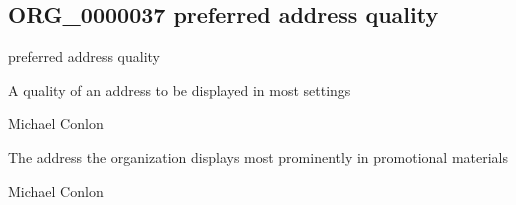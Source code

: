 \documentclass[letterpaper,10pt,english]{sphinxmanual}
\begin{document}
\subsection{ORG\_0000037 \sphinxhyphen{} preferred address quality}
\label{\detokenize{doc-ORG_0000037:org-0000037-preferred-address-quality}}\label{\detokenize{doc-ORG_0000037:index-0}}\label{\detokenize{doc-ORG_0000037::doc}}
\begin{sphinxShadowBox}

\sphinxAtStartPar
preferred address quality
\end{sphinxShadowBox}

\begin{sphinxShadowBox}

\sphinxAtStartPar
{\hyperref[\detokenize{doc-BFO_0000019::doc}]{}}
\end{sphinxShadowBox}

\begin{sphinxShadowBox}

\sphinxAtStartPar
A quality of an address to be displayed in most settings
\end{sphinxShadowBox}

\begin{sphinxShadowBox}

\sphinxAtStartPar
Michael Conlon 
\end{sphinxShadowBox}

\begin{sphinxShadowBox}

\sphinxAtStartPar
The address the organization displays most prominently in promotional materials
\end{sphinxShadowBox}

\begin{sphinxShadowBox}

\sphinxAtStartPar
Michael Conlon 
\end{sphinxShadowBox}
\begin{quote}

\ignorespaces \end{quote}
\end{document}
